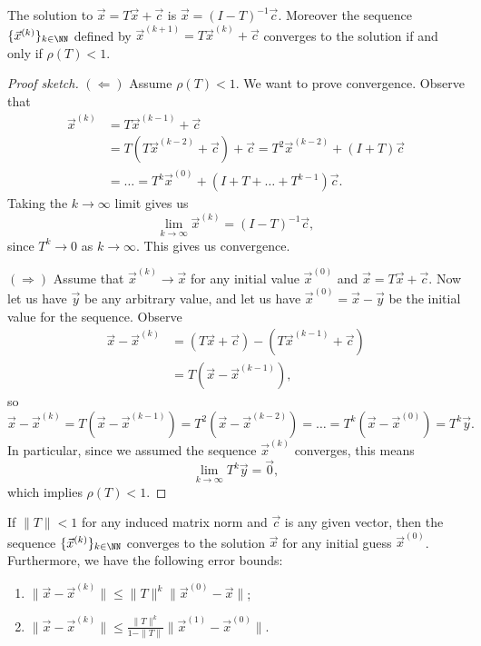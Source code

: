 \begin{lemma}
The solution to $\vec{x}=T\vec{x}+\vec{c}$ is $\vec{x}=(I-T)^{-1}\vec{c}$.
Moreover the sequence $\{\vec{x}^{(k)}\}_{k\in\NN}$ defined by
$\vec{x}^{(k+1)}=T\vec{x}^{(k)}+\vec{c}$ converges to the solution if
and only if $\rho(T)<1$.
\end{lemma}

\begin{proof}[Proof sketch]
$(\Longleftarrow)$ Assume $\rho(T)<1$. We want to prove
convergence. Observe that 
\begin{align*}
\vec{x}^{(k)}
&=T\vec{x}^{(k-1)}+\vec{c}\\
&=T(T\vec{x}^{(k-2)}+\vec{c})+\vec{c}=T^{2}\vec{x}^{(k-2)}+(I+T)\vec{c}\\
&=\dots=T^{k}\vec{x}^{(0)}+(I+T+\dots+T^{k-1})\vec{c}.
\end{align*}
Taking the $k\to\infty$ limit gives us
\begin{equation}
\lim_{k\to\infty}\vec{x}^{(k)}=(I-T)^{-1}\vec{c},
\end{equation}
since $T^{k}\to0$ as $k\to\infty$. This gives us convergence.

$(\Longrightarrow)$ Assume that $\vec{x}^{(k)}\to\vec{x}$ for any
initial value $\vec{x}^{(0)}$ and $\vec{x}=T\vec{x}+\vec{c}$. Now let us
have $\vec{y}$ be any arbitrary value, and let us have
$\vec{x}^{(0)}=\vec{x}-\vec{y}$ be the initial value for the sequence.
Observe
\begin{equation}
\begin{split}
\vec{x}-\vec{x}^{(k)}&=(T\vec{x}+\vec{c})-(T\vec{x}^{(k-1)}+\vec{c})\\
&=T(\vec{x}-\vec{x}^{(k-1)}),
\end{split}
\end{equation}
so
\begin{equation}
\vec{x}-\vec{x}^{(k)}=T(\vec{x}-\vec{x}^{(k-1)})=T^{2}(\vec{x}-\vec{x}^{(k-2)})
=\dots=T^{k}(\vec{x}-\vec{x}^{(0)})=T^{k}\vec{y}.
\end{equation}
In particular, since we assumed the sequence $\vec{x}^{(k)}$ converges,
this means
\begin{equation}
\lim_{k\to\infty}T^{k}\vec{y}=\vec{0},
\end{equation}
which implies $\rho(T)<1$.
\end{proof}

\begin{prop}
If $\|T\|<1$ for any induced matrix norm and $\vec{c}$ is any given
vector, then the sequence $\{\vec{x}^{(k)}\}_{k\in\NN}$ converges to the
solution $\vec{x}$ for any initial guess $\vec{x}^{(0)}$. Furthermore,
we have the following error bounds:
\begin{enumerate}
\item $\|\vec{x}-\vec{x}^{(k)}\|\leq\|T\|^{k}\|\vec{x}^{(0)}-\vec{x}\|$;
\item $\displaystyle\|\vec{x}-\vec{x}^{(k)}\|\leq\frac{\|T\|^{k}}{1-\|T\|}\|\vec{x}^{(1)}-\vec{x}^{(0)}\|$.
\end{enumerate}
\end{prop}

